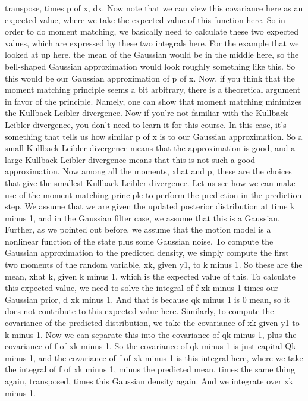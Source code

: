 transpose, times p of x, dx.
Now note that we can view this covariance here
as an expected value, where we take
the expected value of this function here.
So in order to do moment matching,
we basically need to calculate these two expected
values, which are expressed by these two integrals here.
For the example that we looked at up here,
the mean of the Gaussian would be in the middle
here, so the bell-shaped Gaussian
approximation would look roughly something like this.
So this would be our Gaussian approximation of p of x.
Now, if you think that the moment matching principle seems
a bit arbitrary, there is a theoretical argument
in favor of the principle.
Namely, one can show that moment matching minimizes
the Kullback-Leibler divergence.
Now if you're not familiar with the Kullback-Leibler
divergence, you don't need to learn it for this course.
In this case, it's something that
tells us how similar p of x is to our Gaussian approximation.
So a small Kullback-Leibler divergence
means that the approximation is good,
and a large Kullback-Leibler divergence means that this is
not such a good approximation.
Now among all the moments, xhat and p,
these are the choices that give the smallest
Kullback-Leibler divergence.
Let us see how we can make use of the moment matching
principle to perform the prediction in the prediction
step.
We assume that we are given the updated posterior distribution
at time k minus 1, and in the Gaussian filter case,
we assume that this is a Gaussian.
Further, as we pointed out before,
we assume that the motion model is
a nonlinear function of the state plus some Gaussian noise.
To compute the Gaussian approximation
to the predicted density, we simply
compute the first two moments of the random variable,
xk, given y1, to k minus 1.
So these are the mean, xhat k, given k minus 1,
which is the expected value of this.
To calculate this expected value,
we need to solve the integral of f xk minus 1 times
our Gaussian prior, d xk minus 1.
And that is because qk minus 1 is
0 mean, so it does not contribute
to this expected value here.
Similarly, to compute the covariance
of the predicted distribution, we
take the covariance of xk given y1 to k minus 1.
Now we can separate this into the covariance of qk minus 1,
plus the covariance of f of xk minus 1.
So the covariance of qk minus 1 is just capital Qk minus 1,
and the covariance of f of xk minus 1
is this integral here, where we take
the integral of f of xk minus 1, minus the predicted mean,
times the same thing again, transposed, times this Gaussian
density again.
And we integrate over xk minus 1.
